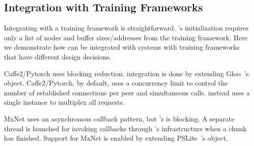 
\subsection{Integration with Training Frameworks}
\label{sec:integration}
Integrating \plink with a training framework is straightforward. \plink{}'s initialization requires only a list of nodes and buffer sizes/addresses from the training framework. %
Here we demonstrate how \plink can be integrated with systems with training frameworks that have different design decisions.

Caffe2/Pytorch uses blocking reduction. \plink integration is done by extending Gloo~\cite{facebook35:online}'s  object. Caffe2/Pytorch, by default, uses a concurrency limit to control the number of established connections per peer and simultaneous  calls. \plink instead uses a single \ha instance to multiplex all requests.

MxNet uses an asynchronous callback pattern, but \plink{}'s  is blocking. A separate thread is launched for invoking callbacks through 's infrastructure when a chunk has finished. Support for MxNet is enabled by extending PSLite~\cite{dmlcpsli50:online}'s  object. %